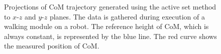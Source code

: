\begin{figure}[!ht]
    \centering
\caption[Projections of {\bf CoM} trajectory to $x\mbox{-}z$ and $y\mbox{-}z$ planes]{
Projections of \acs{CoM} trajectory generated using the active set method to $x\mbox{-}z$ 
and $y\mbox{-}z$ planes. The data is gathered during execution of a walking module on 
a robot. The reference height of \ac{CoM}, which is always constant, is represented by 
the blue line. The red curve shows the measured position of \ac{CoM}.}
\label{fig.com_xyz}
\end{figure}

